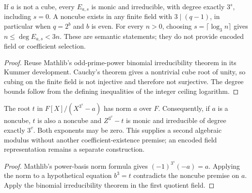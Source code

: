 \begin{theorem}
  \label{thm:lowerbounds-algebraic-binomial-modulus}
  \leanok
  If $a$ is not a cube, every $E_{a,s}$ is monic and irreducible,
  with degree exactly $3^s$, including $s=0$. A noncube exists in any
  finite field with $3\mid(q-1)$, in particular when $q=2^b$ and $b$
  is even. For every $n>0$, choosing $s=\lceil\log_3 n\rceil$
  gives $n\le\deg E_{a,s}<3n$. These are semantic statements;
  they do not provide encoded field or coefficient selection.
\end{theorem}
\begin{proof}
  \leanok
  Reuse Mathlib's odd-prime-power binomial irreducibility theorem in
  its Kummer development. Cauchy's theorem gives a nontrivial cube
  root of unity, so cubing on the finite field is not injective and
  therefore not surjective. The degree bounds follow from the
  defining inequalities of the integer ceiling logarithm.
\end{proof}

\begin{theorem}
  \label{thm:lowerbounds-algebraic-binomial-extension}
  \leanok
  The root $t$ in $F[X]/(X^{3^s}-a)$ has norm $a$ over $F$.
  Consequently, if $a$ is a noncube, $t$ is also a noncube and
  $Z^{3^v}-t$ is monic and irreducible of degree exactly $3^v$.
  Both exponents may be zero. This supplies a second algebraic
  modulus without another coefficient-existence premise; an encoded
  field representation remains a separate construction.
\end{theorem}
\begin{proof}
  \leanok
  Mathlib's power-basis norm formula gives $(-1)^{3^s}(-a)=a$.
  Applying the norm to a hypothetical equation $b^3=t$ contradicts
  the noncube premise on $a$. Apply the binomial irreducibility theorem
  in the first quotient field.
\end{proof}


